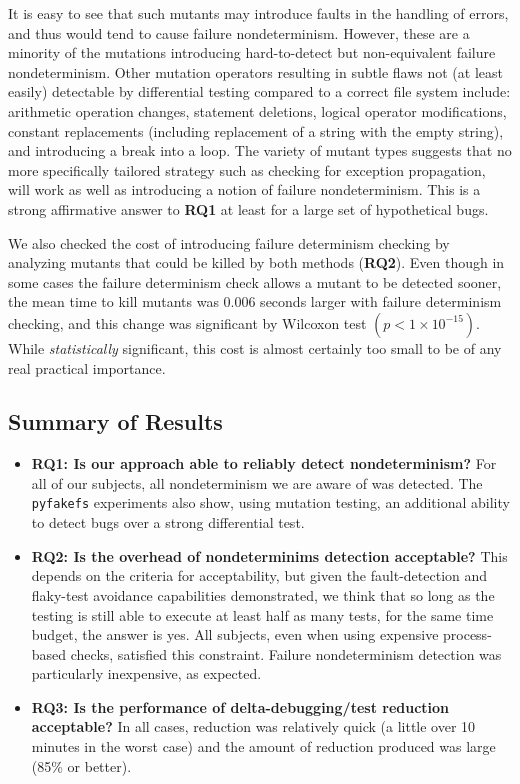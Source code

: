 \noindent It is easy to
see that such mutants may introduce faults in the handling of
errors, and thus would tend to cause failure nondeterminism.  However,
these are a minority of the mutations introducing hard-to-detect but
non-equivalent failure
nondeterminism.  Other mutation operators resulting in subtle flaws
not (at least easily) detectable by differential testing compared to a
correct file system include:  arithmetic operation changes, statement
deletions, logical operator modifications, constant replacements
(including replacement of a string with the empty string), and
introducing a break into a loop.  The variety of mutant types suggests
that no more specifically tailored strategy such as checking for
exception propagation, will work as well as introducing a notion of
failure nondeterminism.  This is a strong affirmative answer to {\bf
  RQ1} at least for a large set of hypothetical bugs.

We also checked the cost of introducing failure determinism checking
by analyzing mutants that could be killed by both methods ({\bf RQ2}).  Even
though in some cases the failure determinism check allows a mutant to
be detected sooner, the mean time to kill mutants was 0.006 seconds
larger with failure determinism checking, and this change was significant by Wilcoxon test
$(p < 1 \times 10^{-15})$.  While \emph{statistically} significant,
this cost is almost certainly
too small to be of any real practical importance.

\subsection{Summary of Results}

\begin{itemize}
\item {\bf RQ1: Is our approach able to reliably detect
  nondeterminism?}  For all of our subjects, all nondeterminism we are
aware of was detected.  The {\tt pyfakefs} experiments also show,
using mutation testing, an additional ability to detect bugs over a
strong differential test.
\item {\bf RQ2: Is the overhead of nondeterminims detection
    acceptable?} This depends on the criteria for acceptability, but
  given the fault-detection and flaky-test avoidance capabilities
  demonstrated, we think that so long as the testing is still able to
  execute at least half as many tests, for the same time budget, the
  answer is yes.  All subjects, even when using expensive
  process-based checks, satisfied this constraint.  Failure
  nondeterminism detection was particularly inexpensive, as expected.
\item {\bf RQ3: Is the performance of delta-debugging/test reduction
    acceptable?}  In all cases, reduction was relatively quick (a
  little over 10 minutes in the worst case) and the amount of
  reduction produced was large (85\% or better).
  \end{itemize}

